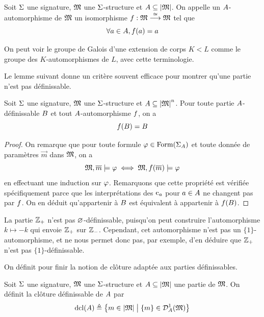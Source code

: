 \begin{definition}
  Soit $\Sigma$ une signature, $\mathfrak{M}$ une $\Sigma$-structure et
  $A\subseteq\left\vert \mathfrak{M}\right\vert$. On appelle un $A$-automorphisme de
  $\mathfrak{M}$ un isomorphisme $f : \displaystyle \mathfrak{M} \overset{\cong}{\longrightarrow} \mathfrak{M}$
  tel que
  \[\forall a \in A, f(a) = a\]
\end{definition}

\begin{remark}
  On peut voir le groupe de Galois d'une extension de corps $K < L$ comme le
  groupe des $K$-automorphismes de $L$, avec cette terminologie.
\end{remark}

Le lemme suivant donne un critère souvent efficace pour montrer qu'une partie
n'est pas définissable.

\begin{lemma}
  Soit $\Sigma$ une signature, $\mathfrak{M}$ une $\Sigma$-structure et
  $A\subseteq\left\vert \mathfrak{M}\right\vert^n$. Pour toute partie $A$-définissable $B$
  et tout $A$-automorphisme $f$, on a
  \[f(B) = B\]
\end{lemma}

\begin{proof}
  On remarque que pour toute formule $\varphi\in\operatorname{Form}(\Sigma_{A})$ et
  toute donnée de paramètres $\vec m$ dans $\mathfrak{M}$, on a
  \[\mathfrak{M},\overline{m} \models\varphi \iff \mathfrak{M},f(\overline{m})\models\varphi\]
  en effectuant une induction sur $\varphi$. Remarquons que cette propriété
  est vérifiée spécifiquement parce que les interprétations des $\mathrm{c}_a$
  pour $a \in A$ ne changent pas par $f$. On en déduit qu'appartenir
  à $B$ est équivalent à appartenir à $f(B)$.
\end{proof}

\begin{example}
  La partie $\mathbb Z_+$ n'est pas $\varnothing$-définissable, puisqu'on peut construire
  l'automorphisme $k \mapsto -k$ qui envoie $\mathbb Z_+$ sur $\mathbb Z_-$. Cependant,
  cet automorphisme n'est pas un $\{1\}$-automorphisme, et ne nous permet donc
  pas, par exemple, d'en déduire que $\mathbb Z_+$ n'est pas $\{1\}$-définissable.
\end{example}

\noindent
On définit pour finir la notion de clôture adaptée aux parties définissables.

\begin{definition}
  Soit $\Sigma$ une signature, $\mathfrak{M}$ une $\Sigma$-structure et
  $A\subseteq\left\vert \mathfrak{M}\right\vert$ une partie de $\mathfrak{M}$. On définit la clôture
  définissable de $A$ par
  \[\operatorname{dcl}(A) \triangleq
  \left\{ m \in \left\vert \mathfrak{M}\right\vert \;\middle\vert\; \{m\}\in\mathcal{D}_{A}^1(\mathfrak{M}) \right\}\]
\end{definition}

